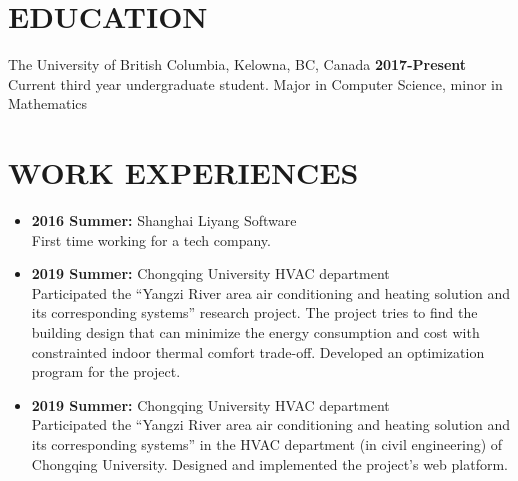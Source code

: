 \documentclass{res}
\begin{document}

\address{jimmy123good@hotmail.com \\ https://github.com/ailrk \\ https://ailrk.github.io/home \\ (250) 899 2600}
\begin{resume}

\section{EDUCATION}
The University of British Columbia, Kelowna, BC, Canada  \hspace{1.2in} \textbf{2017-Present}\\
    Current third year undergraduate student. Major in Computer Science, minor in Mathematics \\

\section{WORK EXPERIENCES}
\begin{itemize}[leftmargin=-.2in]
    \setlength\itemsep{-1em}
    \item \textbf{2016 Summer:} Shanghai Liyang Software
    \vspace{0.05in}\\
    First time working for a tech company. \\
    \item \textbf{2019 Summer:} Chongqing University HVAC department
        \vspace{0.05in}\\ Participated the ``Yangzi River area air conditioning and heating solution and its corresponding systems'' research project. The project tries to find the building design that can minimize the energy consumption and cost with constrainted indoor thermal comfort trade-off. Developed an optimization program for the project. \\
    \item \textbf{2019 Summer:} Chongqing University HVAC department
    \vspace{0.05in}\\
    Participated the ``Yangzi River area air conditioning and heating solution and its corresponding systems'' in the HVAC department (in civil engineering) of Chongqing University.  Designed and implemented the project's web platform. \\


\end{itemize}
\end{resume}
\end{document}
